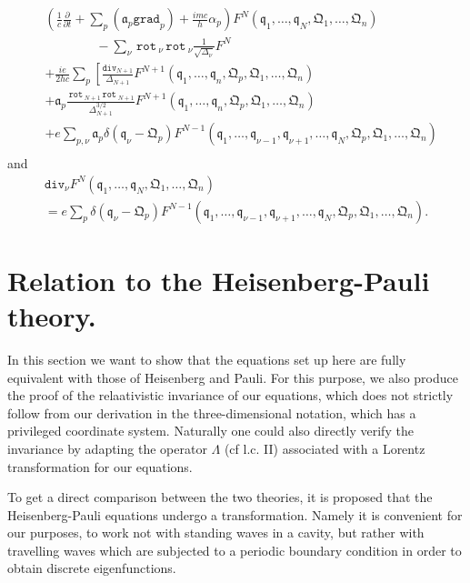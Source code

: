 \documentclass[a4paper,11pt]{article}
\newcommand{\?}[2]{#1\footnote{\textsc{Translator note}: #2}}
\newcommand{\nequ}[2]{\begin{align*}\tag{#1}#2\end{align*}}
\renewcommand{\operatorfont}[1]{\texttt{#1}}
\newcommand{\grad}{\operatorfont{grad}}
\renewcommand{\div}{\operatorfont{div}}
\newcommand{\rot}{\,\operatorfont{rot}\,}
\newcommand{\pXpY}[2]{\frac{\partial #1}{\partial #2}}
\newcommand{\mf}[1]{\mathfrak{#1}}
\begin{document}
\nequ{26}{
&\left(\frac{1}{c}\pXpY{}{t} + \sum\limits_p(\mf{a}_p \grad_p) + \frac{imc}{h}\alpha_p\right)F^N(\mf{q}_1,\dots,\mf{q}_N,\mf{Q}_1,\dots,\mf{Q}_n)\\
&\quad\quad\quad\quad- \sum\limits_\nu\rot_\nu\rot_\nu\frac{1}{\sqrt{\Delta_\nu}}F^N\\
& + \frac{ie}{2hc}\sum\limits_p\left[\frac{\div_{N+1}}{\Delta_{N+1}}F^{N+1}(\mf{q}_1,\dots,\mf{q}_n,\mf{Q}_p,\mf{Q}_1,\dots,\mf{Q}_n)\right.\\
& + \mf{a}_p\frac{\rot_{N+1}\rot_{N+1}}{\Delta_{N+1}^{3/2}}F^{N+1}(\mf{q}_1,\dots,\mf{q}_n,\mf{Q}_p,\mf{Q}_1,\dots,\mf{Q}_n)\\
& + e\sum\limits_{p,\nu}\mf{a}_p\delta(\mf{q}_\nu - \mf{Q}_p) F^{N-1}(\mf{q}_1,\dots,\mf{q}_{\nu-1},\mf{q}_{\nu+1},\dots,\mf{q}_N,\mf{Q}_p,\mf{Q}_1,\dots,\mf{Q}_n)\\
}
and
\nequ{26a}{
\div_\nu F^N(\mf{q}_1,\dots,\mf{q}_N,\mf{Q}_1,\dots,\mf{Q}_n)\\
 = e\sum\limits_p \delta(\mf{q}_\nu - \mf{Q}_p)F^{N-1}(\mf{q}_1,\dots,\mf{q}_{\nu-1},\mf{q}_{\nu+1},\dots,\mf{q}_N,\mf{Q}_p,\mf{Q}_1,\dots,\mf{Q}_n).
}

\section{Relation to the Heisenberg-Pauli theory.} In this section we want to show that the equations set up here are fully equivalent with those of Heisenberg and Pauli. For this purpose, we also produce the proof of the relaativistic invariance of our equations, which does not strictly follow from our derivation in the three-dimensional notation, which has a privileged coordinate system. Naturally one could also directly verify the invariance by adapting the operator $\Lambda$ (cf l.c. II) associated with a Lorentz transformation for our equations.

To get a direct comparison between the two theories, it is proposed that the Heisenberg-Pauli equations undergo a transformation. Namely it is convenient for our purposes, to work not with standing waves in a cavity, but rather with travelling waves which are subjected to a periodic boundary condition in order to obtain discrete eigenfunctions.
\end{document}

